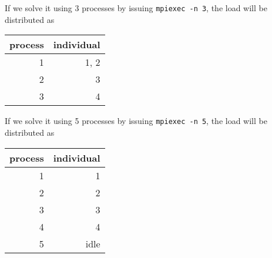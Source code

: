 \documentclass[11pt]{article}
\begin{document}
If we solve it using
3 processes by issuing \texttt{mpiexec -n 3}, the load will be
distributed as
\begin{center}
\begin{tabular}{rr}
process & individual\\
\hline
1 & 1, 2\\
2 & 3\\
3 & 4\\
\end{tabular}
\end{center}

If we solve it using
5 processes by issuing \texttt{mpiexec -n 5}, the load will be
distributed as
\begin{center}
\begin{tabular}{rr}
process & individual\\
\hline
1 & 1\\
2 & 2\\
3 & 3\\
4 & 4\\
5 & idle\\
\end{tabular}
\end{center}
\end{document}
